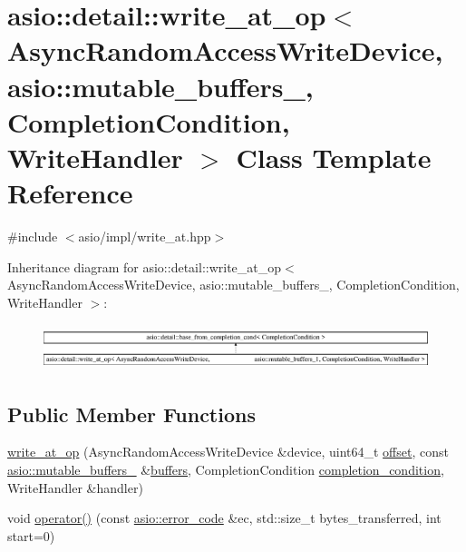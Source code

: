 \hypertarget{classasio_1_1detail_1_1write__at__op_3_01_async_random_access_write_device_00_01_01_01_01_01_01_9c63ca7e3422e806874cb49cd5be5156}{}\section{asio\+:\+:detail\+:\+:write\+\_\+at\+\_\+op$<$ Async\+Random\+Access\+Write\+Device, asio\+:\+:mutable\+\_\+buffers\+\_, Completion\+Condition, Write\+Handler $>$ Class Template Reference}
\label{classasio_1_1detail_1_1write__at__op_3_01_async_random_access_write_device_00_01_01_01_01_01_01_9c63ca7e3422e806874cb49cd5be5156}


{\ttfamily \#include $<$asio/impl/write\+\_\+at.\+hpp$>$}

Inheritance diagram for asio\+:\+:detail\+:\+:write\+\_\+at\+\_\+op$<$ Async\+Random\+Access\+Write\+Device, asio\+:\+:mutable\+\_\+buffers\+\_, Completion\+Condition, Write\+Handler $>$\+:\begin{figure}[H]
\begin{center}
\leavevmode
\includegraphics[height=1.325444cm]{classasio_1_1detail_1_1write__at__op_3_01_async_random_access_write_device_00_01_01_01_01_01_01_9c63ca7e3422e806874cb49cd5be5156}
\end{center}
\end{figure}
\subsection*{Public Member Functions}
\begin{DoxyCompactItemize}
\item 
\hyperlink{classasio_1_1detail_1_1write__at__op_3_01_async_random_access_write_device_00_01_01_01_01_01_01_9c63ca7e3422e806874cb49cd5be5156_aaba79692cd54e5ff5fe47ca61a3e2a97}{write\+\_\+at\+\_\+op} (Async\+Random\+Access\+Write\+Device \&device, uint64\+\_\+t \hyperlink{group__async__read__at_ga8dcdb41a4adfd6fe5322b5dd666d9f29}{offset}, const \hyperlink{classasio_1_1mutable__buffers__1}{asio\+::mutable\+\_\+buffers\+\_} \&\hyperlink{group__async__read_ga54dede45c3175148a77fe6635222c47d}{buffers}, Completion\+Condition \hyperlink{group__async__read_gae2e215d5013596cc2b385bb6c13fa518}{completion\+\_\+condition}, Write\+Handler \&handler)
\item 
void \hyperlink{classasio_1_1detail_1_1write__at__op_3_01_async_random_access_write_device_00_01_01_01_01_01_01_9c63ca7e3422e806874cb49cd5be5156_afdbdba04bcb558fd483d10562ddd89fc}{operator()} (const \hyperlink{classasio_1_1error__code}{asio\+::error\+\_\+code} \&ec, std\+::size\+\_\+t bytes\+\_\+transferred, int start=0)
\end{DoxyCompactItemize}
